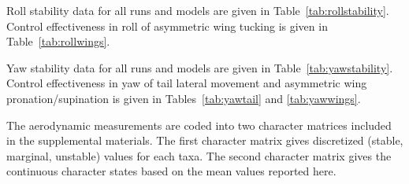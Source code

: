 Roll stability data for all runs and models are given in Table~\ref{tab:rollstability}. Control effectiveness in roll of asymmetric wing tucking is given in Table~\ref{tab:rollwings}.
%
%

Yaw stability data for all runs and models are given in Table~\ref{tab:yawstability}. Control effectiveness in yaw of tail lateral movement and asymmetric wing pronation/supination is given in Tables~\ref{tab:yawtail} and \ref{tab:yawwings}.
%
%
%
%

The aerodynamic measurements are coded into two character matrices included in the supplemental materials.  The first character matrix gives discretized (stable, marginal, unstable) values for each taxa.  The second character matrix gives the continuous character states based on the mean values reported here.  



